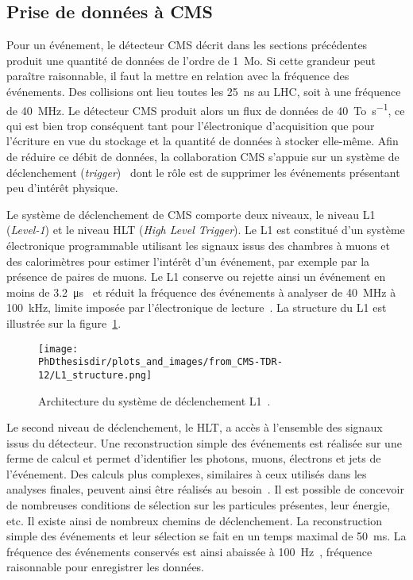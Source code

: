 \subsection{Prise de données à CMS}\label{chapter-LHC-section-CMS-subsec-data_taking}
Pour un événement, le détecteur CMS décrit dans les sections précédentes produit une quantité de données de l'ordre de \SI{1}{\mega o}.
Si cette grandeur peut paraître raisonnable, il faut la mettre en relation avec la fréquence des événements.
Des collisions ont lieu toutes les \SI{25}{\nano\second} au LHC, soit à une fréquence de \SI{40}{\mega\hertz}.
Le détecteur CMS produit alors un flux de données de \SI{40}{\tera o.\second^{-1}}, ce qui est bien trop conséquent tant pour l'électronique d'acquisition que pour l'écriture en vue du stockage et la quantité de données à stocker elle-même.
Afin de réduire ce débit de données, la collaboration CMS s'appuie sur un système de déclenchement (\emph{trigger})~\cite{cms_paper,CERN-LHCC-2000-038,CERN-LHCC-2002-026,CMS-TRG-12-001,CMS-TDR-12} dont le rôle est de supprimer les événements présentant peu d'intérêt physique.
\par Le système de déclenchement de CMS comporte deux niveaux, le niveau \og L1 \fg{} (\emph{Level-1}) et le niveau \og HLT \fg{} (\emph{High Level Trigger}).
Le L1 est constitué d'un système électronique programmable utilisant les signaux issus des chambres à muons et des calorimètres pour estimer l'intérêt d'un événement, par exemple par la présence de paires de muons.
Le L1 conserve ou rejette ainsi un événement en moins de \SI{3.2}{\micro\second}~\cite{cms_paper} et réduit la fréquence des événements à analyser de \SI{40}{\mega\hertz} à \SI{100}{\kilo\hertz}, limite imposée par l'électronique de lecture~\cite{CMS-TRG-12-001}.
La structure du L1 est illustrée sur la figure~\ref{fig-chapter-LHC-section-CMS-subsec-data_taking-cms_paper-fig_8-1}.
\begin{figure}[h]
\centering
\texttt{[image: \\PhDthesisdir/plots\_and\_images/from\_CMS-TDR-12/L1\_structure.png]}
\caption[Architecture du système de déclenchement L1.]{Architecture du système de déclenchement L1~\cite{CMS-TDR-12}.}
\label{fig-chapter-LHC-section-CMS-subsec-data_taking-cms_paper-fig_8-1}
\end{figure}
\par Le second niveau de déclenchement, le HLT, a accès à l'ensemble des signaux issus du détecteur.
Une reconstruction simple des événements est réalisée sur une ferme de calcul et permet d'identifier les photons, muons, électrons et jets de l'événement.
Des calculs plus complexes, similaires à ceux utilisés dans les analyses finales, peuvent ainsi être réalisés au besoin~\cite{cms_paper}.
Il est possible de concevoir de nombreuses conditions de sélection sur les particules présentes, leur énergie, etc.
Il existe ainsi de nombreux chemins de déclenchement.
La reconstruction simple des événements et leur sélection se fait en un temps maximal de \SI{50}{\milli\second}.
La fréquence des événements conservés est ainsi abaissée à \SI{100}{\hertz}~\cite{cms_paper,CMS-TRG-12-001}, fréquence raisonnable pour enregistrer les données.